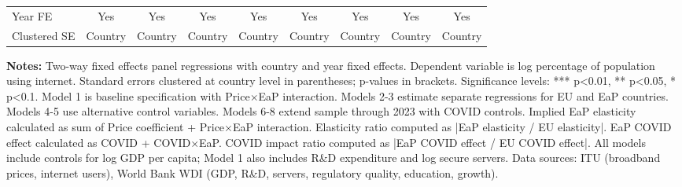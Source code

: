 \begin{table}[htbp]
\begin{tabular}{@{}lcccccccc@{}}
Year FE & Yes & Yes & Yes & Yes & Yes & Yes & Yes & Yes \\
Clustered SE & Country & Country & Country & Country & Country & Country & Country & Country \\
\bottomrule
\end{tabular}
\begin{tablenotes}
\small
\item \textbf{Notes:} Two-way fixed effects panel regressions with country and year fixed effects. Dependent variable is log percentage of population using internet. Standard errors clustered at country level in parentheses; p-values in brackets. Significance levels: *** p<0.01, ** p<0.05, * p<0.1. Model 1 is baseline specification with Price$\times$EaP interaction. Models 2-3 estimate separate regressions for EU and EaP countries. Models 4-5 use alternative control variables. Models 6-8 extend sample through 2023 with COVID controls. Implied EaP elasticity calculated as sum of Price coefficient + Price$\times$EaP interaction. Elasticity ratio computed as |EaP elasticity / EU elasticity|. EaP COVID effect calculated as COVID + COVID$\times$EaP. COVID impact ratio computed as |EaP COVID effect / EU COVID effect|. All models include controls for log GDP per capita; Model 1 also includes R\&D expenditure and log secure servers. Data sources: ITU (broadband prices, internet users), World Bank WDI (GDP, R\&D, servers, regulatory quality, education, growth).
\end{tablenotes}
\end{table}
